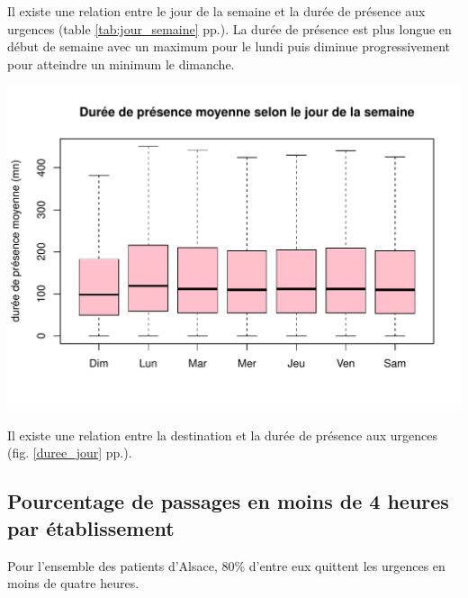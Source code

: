 \documentclass[12pt,english,french,twoside]{book}\usepackage[]{graphicx}\usepackage[]{color}
\makeatletter
\def\maxwidth{ %
  \ifdim\Gin@nat@width>\linewidth
    \linewidth
  \else
    \Gin@nat@width
  \fi
}
\newenvironment{knitrout}{}{} %
\makeatother
\begin{document}
Il existe une relation entre le jour de la semaine et la durée de présence aux urgences (table \ref{tab:jour_semaine} pp.\pageref{tab:jour_semaine}). La durée de présence est plus longue en début de semaine avec un maximum pour le lundi puis diminue progressivement pour atteindre un minimum le dimanche.

\begin{center}
\begin{knitrout}
\color{fgcolor}
\includegraphics[width=\maxwidth]{figure/bp_jour_presence-1} 

\end{knitrout}
 \label{duree_jour}
\end{center}

Il existe une relation entre la destination et la durée de présence aux urgences (fig. \ref{duree_jour} pp.\pageref{duree_jour}).


\subsection{Pourcentage de passages en moins de 4 heures par établissement}



Pour l'ensemble des patients d'Alsace, 80\% d'entre eux quittent les urgences en moins de quatre heures.

\end{document}
